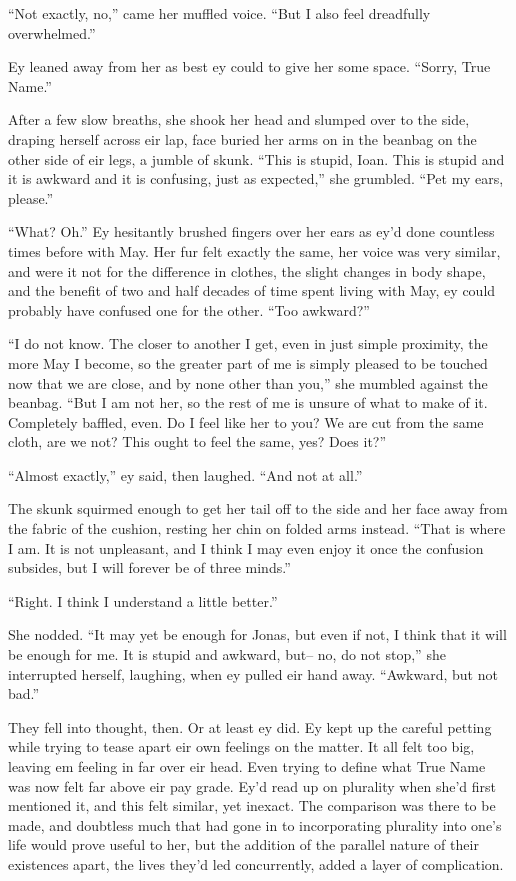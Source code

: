 ``Not exactly, no,'' came her muffled voice. ``But I also feel dreadfully overwhelmed.''

Ey leaned away from her as best ey could to give her some space. ``Sorry, True Name.''

After a few slow breaths, she shook her head and slumped over to the side, draping herself across eir lap, face buried her arms on in the beanbag on the other side of eir legs, a jumble of skunk. ``This is stupid, Ioan. This is stupid and it is awkward and it is confusing, just as expected,'' she grumbled. ``Pet my ears, please.''

``What? Oh.'' Ey hesitantly brushed fingers over her ears as ey'd done countless times before with May. Her fur felt exactly the same, her voice was very similar, and were it not for the difference in clothes, the slight changes in body shape, and the benefit of two and half decades of time spent living with May, ey could probably have confused one for the other. ``Too awkward?''

``I do not know. The closer to another I get, even in just simple proximity, the more May I become, so the greater part of me is simply pleased to be touched now that we are close, and by none other than you,'' she mumbled against the beanbag. ``But I am not her, so the rest of me is unsure of what to make of it. Completely baffled, even. Do I feel like her to you? We are cut from the same cloth, are we not? This ought to feel the same, yes? Does it?''

``Almost exactly,'' ey said, then laughed. ``And not at all.''

The skunk squirmed enough to get her tail off to the side and her face away from the fabric of the cushion, resting her chin on folded arms instead. ``That is where I am. It is not unpleasant, and I think I may even enjoy it once the confusion subsides, but I will forever be of three minds.''

``Right. I think I understand a little better.''

She nodded. ``It may yet be enough for Jonas, but even if not, I think that it will be enough for me. It is stupid and awkward, but-- no, do not stop,'' she interrupted herself, laughing, when ey pulled eir hand away. ``Awkward, but not bad.''

They fell into thought, then. Or at least ey did. Ey kept up the careful petting while trying to tease apart eir own feelings on the matter. It all felt too big, leaving em feeling in far over eir head. Even trying to define what True Name was now felt far above eir pay grade. Ey'd read up on plurality when she'd first mentioned it, and this felt similar, yet inexact. The comparison was there to be made, and doubtless much that had gone in to incorporating plurality into one's life would prove useful to her, but the addition of the parallel nature of their existences apart, the lives they'd led concurrently, added a layer of complication.

